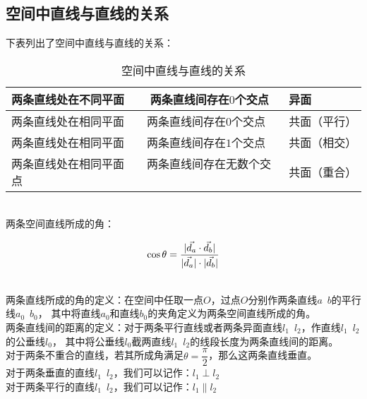 \documentclass[UTF8]{ctexart}
\let\nvec\vec
\def\vec#1{\nvec{\vphantom b\smash{#1}}}
\begin{document}
\subsection{空间中直线与直线的关系}
    下表列出了空间中直线与直线的关系：\vspace{5pt}
    \begin{table}[h]
        \begin{center}
            \begin{tabular}{l|l}
                \hline
                两条直线处在不同平面~~~~两条直线间存在$0$个交点&异面\\ \hline
                两条直线处在相同平面~~~~两条直线间存在$0$个交点&共面（平行）\\ \hline
                两条直线处在相同平面~~~~两条直线间存在$1$个交点&共面（相交）\\ \hline
                两条直线处在相同平面~~~~两条直线间存在无数个交点&共面（重合）\\ \hline
            \end{tabular}
            \caption{空间中直线与直线的关系}
        \end{center}
    \end{table}\\
    两条空间直线所成的角：
    \begin{large}
        \begin{equation*}
            \cos{\theta}=\frac{|\vec{d_a}\cdot\vec{d_b}|}{|\vec{d_a}|\cdot|\vec{d_b}|}
        \end{equation*}
    \end{large}\\
    两条直线所成的角的定义：在空间中任取一点$O$，过点$O$分别作两条直线$a$~$b$的平行线$a_{0}$~$b_{0}$，
    其中将直线$a_{0}$和直线$b_{0}$的夹角定义为两条空间直线所成的角。\\[3mm]
    两条直线间的距离的定义：对于两条平行直线或者两条异面直线$l_1$~$l_2$，作直线$l_1$~$l_2$的公垂线$l_0$，
    其中将公垂线$l_0$截两直线$l_1$~$l_2$的线段长度为两条直线间的距离。\\[6mm]
    对于两条不重合的直线，若其所成角满足$\theta=\dfrac{\pi}{2}$，那么这两条直线垂直。\\[4mm]
    对于两条垂直的直线$l_1$~$l_2$，我们可以记作：$l_1\perp l_2$\\[3mm]
    对于两条平行的直线$l_1$~$l_2$，我们可以记作：$l_1\parallel l_2$
\end{document}
